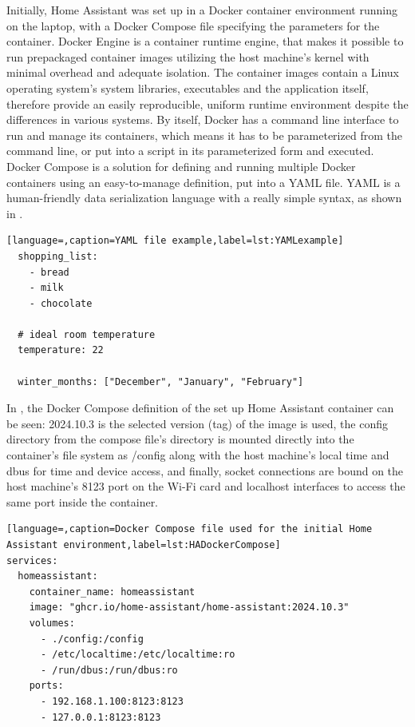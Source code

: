 Initially, Home Assistant was set up in a Docker container environment running on the laptop, with a Docker Compose file specifying the parameters for the container. Docker Engine is a container runtime engine, that makes it possible to run prepackaged container images utilizing the host machine's kernel with minimal overhead and adequate isolation. \cite{DockerContainer} The container images contain a Linux operating system's system libraries, executables and the application itself, therefore provide an easily reproducible, uniform runtime environment despite the differences in various systems. By itself, Docker has a command line interface to run and manage its containers, which means it has to be parameterized from the command line, or put into a script in its parameterized form and executed. Docker Compose is a solution for defining and running multiple Docker containers using an easy-to-manage definition, put into a YAML file. \cite{DockerCompose} YAML is a human-friendly data serialization language with a really simple syntax, as shown in . \cite{YAMLHomepage}

\begin{lstlisting}[language=,caption=YAML file example,label=lst:YAMLexample]
  shopping_list:
    - bread
    - milk
    - chocolate

  # ideal room temperature
  temperature: 22

  winter_months: ["December", "January", "February"]
\end{lstlisting}

In , the Docker Compose definition of the set up Home Assistant container can be seen: 2024.10.3 is the selected version (tag) of the image is used, the config directory from the compose file's directory is mounted directly into the container's file system as /config along with the host machine's local time and dbus for time and device access, and finally, socket connections are bound on the host machine's 8123 port on the Wi-Fi card and localhost interfaces to access the same port inside the container.\break

\begin{lstlisting}[language=,caption=Docker Compose file used for the initial Home Assistant environment,label=lst:HADockerCompose]
services:
  homeassistant:
    container_name: homeassistant
    image: "ghcr.io/home-assistant/home-assistant:2024.10.3"
    volumes:
      - ./config:/config
      - /etc/localtime:/etc/localtime:ro
      - /run/dbus:/run/dbus:ro
    ports:
      - 192.168.1.100:8123:8123
      - 127.0.0.1:8123:8123
\end{lstlisting}

